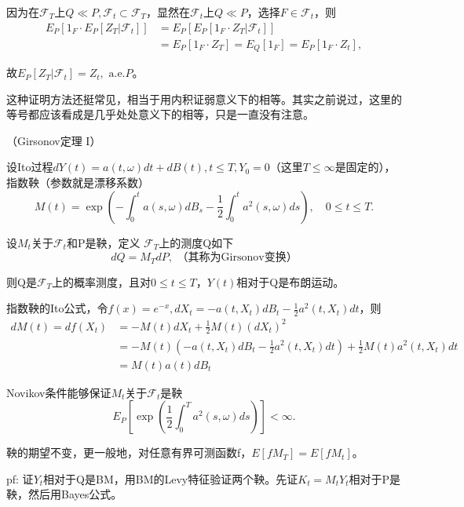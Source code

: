 \begin{pf}
  因为在$\mathcal{F}_{T}$上$Q \ll P, \mathcal{F}_{t} \subset \mathcal{F}_{T}$，显然在$\mathcal{F}_{t}$上$Q \ll P$，选择$F \in \mathcal{F}_{t}$，则
  \[
    \begin{aligned}
      E_{P}\left[1_{F} \cdot E_{P}\left[Z_{T} | \mathcal{F}_{t}\right]\right] & =E_{P}\left[E_{P}\left[1_{F} \cdot Z_{T} | \mathcal{F}_{t}\right]\right] \\
      & =E_{P}\left[1_{F} \cdot Z_{T}\right]=E_{Q}\left[1_{F}\right]=E_{P}\left[1_{F} \cdot Z_{t}\right],
    \end{aligned}
  \]

  故$E_{P}\left[Z_{T} | \mathcal{F}_{t}\right]=Z_{t}, \text { a.e.} P$。
\end{pf}

这种证明方法还挺常见，相当于用内积证弱意义下的相等。其实之前说过，这里的等号都应该看成是几乎处处意义下的相等，只是一直没有注意。

\begin{thm}（Girsonov定理 I）
  
  设Ito过程$d Y(t)=a(t, \omega) d t+d B(t), t \le T, Y_{0}=0$（这里$T \le \infty$是固定的），指数鞅（参数就是漂移系数）
  \[
    M(t)=\exp \left(-\int_{0}^{t} a(s, \omega) d B_{s}-\frac{1}{2} \int_{0}^{t} a^{2}(s, \omega) d s\right), \quad 0 \leq t \leq T.
  \]

  设$M_{t}$关于$\mathcal{F}_{t}$和P是鞅，定义  $\mathcal{F}_{T}$上的测度Q如下
  \[
    d Q=M_{T} d P, \text{ （其称为Girsonov变换）}
  \]

  则Q是$\mathcal{F}_{T}$上的概率测度，且对$0 \leq t \leq T$，$Y(t)$相对于Q是布朗运动。
\end{thm}

指数鞅的Ito公式，令$f(x) = e^{-x}, dX_t = -a(t, X_t) dB_t - \frac{1}{2} a^2(t, X_t) dt$，则
\[
  \begin{aligned}
    dM(t) = df(X_t) &= -M(t)dX_t + \frac{1}{2}M(t)(dX_t)^2\\
    &= -M(t)(-a(t, X_t) dB_t - \frac{1}{2} a^2(t, X_t) dt) + \frac{1}{2}M(t) a^2(t, X_t) dt\\
    &= M(t) a(t) dB_t
  \end{aligned}
\]

Novikov条件能够保证$M_{t}$关于$\mathcal{F}_{t}$是鞅
\[
  E_{P}\left[\exp \left(\frac{1}{2} \int_{0}^{T} a^{2}(s, \omega) d s\right)\right]<\infty.
\]

鞅的期望不变，更一般地，对任意有界可测函数f，$E[fM_T] = E[fM_t]$。

pf: 证$Y_t$相对于Q是BM，用BM的Levy特征验证两个鞅。先证$K_t = M_t Y_t$相对于P是鞅，然后用Bayes公式。

